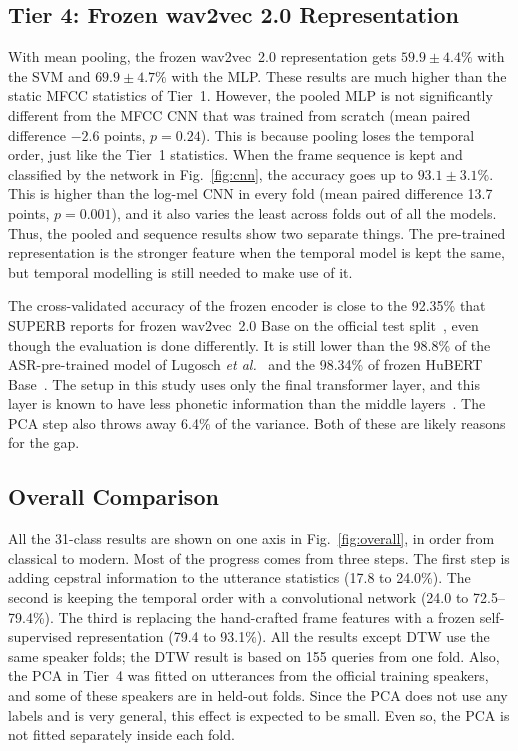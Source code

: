 \documentclass[conference]{IEEEtran}
\begin{document}
\subsection{Tier 4: Frozen wav2vec 2.0 Representation}
With mean pooling, the frozen wav2vec~2.0 representation gets $59.9 \pm 4.4\%$ with the SVM and $69.9 \pm 4.7\%$ with the MLP. These results are much higher than the static MFCC statistics of Tier~1. However, the pooled MLP is not significantly different from the MFCC CNN that was trained from scratch (mean paired difference $-2.6$ points, $p = 0.24$). This is because pooling loses the temporal order, just like the Tier~1 statistics. When the frame sequence is kept and classified by the network in Fig.~\ref{fig:cnn}, the accuracy goes up to $93.1 \pm 3.1\%$. This is higher than the log-mel CNN in every fold (mean paired difference 13.7 points, $p = 0.001$), and it also varies the least across folds out of all the models. Thus, the pooled and sequence results show two separate things. The pre-trained representation is the stronger feature when the temporal model is kept the same, but temporal modelling is still needed to make use of it.

The cross-validated accuracy of the frozen encoder is close to the 92.35\% that SUPERB reports for frozen wav2vec~2.0 Base on the official test split~\cite{yang2021superb}, even though the evaluation is done differently. It is still lower than the 98.8\% of the ASR-pre-trained model of Lugosch \emph{et al.}~\cite{lugosch2019fsc} and the 98.34\% of frozen HuBERT Base~\cite{yang2021superb}. The setup in this study uses only the final transformer layer, and this layer is known to have less phonetic information than the middle layers~\cite{pasad2021layerwise}. The PCA step also throws away 6.4\% of the variance. Both of these are likely reasons for the gap.

\subsection{Overall Comparison}
All the 31-class results are shown on one axis in Fig.~\ref{fig:overall}, in order from classical to modern. Most of the progress comes from three steps. The first step is adding cepstral information to the utterance statistics (17.8 to 24.0\%). The second is keeping the temporal order with a convolutional network (24.0 to 72.5--79.4\%). The third is replacing the hand-crafted frame features with a frozen self-supervised representation (79.4 to 93.1\%). All the results except DTW use the same speaker folds; the DTW result is based on 155 queries from one fold. Also, the PCA in Tier~4 was fitted on utterances from the official training speakers, and some of these speakers are in held-out folds. Since the PCA does not use any labels and is very general, this effect is expected to be small. Even so, the PCA is not fitted separately inside each fold.
\end{document}
